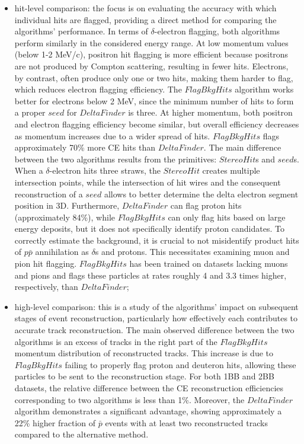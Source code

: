 \begin{itemize}
    \item hit-level comparison: the focus is on evaluating the 
    accuracy with which individual hits are flagged, providing a 
    direct method for comparing the algorithms' performance. In terms 
    of $\delta$-electron flagging, both algorithms perform similarly in the 
    considered energy range. At low momentum values (below 1-2 MeV/c), positron hit flagging 
    is more efficient because positrons are not produced by Compton scattering, 
    resulting in fewer hits. Electrons, by contrast, often produce only one 
    or two hits, making them harder to flag, which reduces electron flagging 
    efficiency. The $FlagBkgHits$ algorithm works better for electrons below 
    2 MeV, since the minimum number of hits to form a 
    proper $seed$ for $DeltaFinder$ is three. At higher momentum, both positron and 
    electron flagging efficiency become similar, but overall efficiency 
    decreases as momentum increases due to a wider spread of hits.
    $FlagBkgHits$ flags approximately 70\% more CE hits than $DeltaFinder$.
    The main difference between the two algorithms results from  
    the primitives: $StereoHit$s and $seed$s. When a $\delta$-electron hits three 
    straws, the $StereoHit$ creates multiple intersection points, while the 
    intersection of hit wires and the consequent reconstruction of 
    a $seed$ allows to better determine the delta electron segment position in 3D. 
    Furthermore, $DeltaFinder$ can flag proton hits (approximately 84\%), while $FlagBkgHits$ 
    can only flag hits based on large energy deposits, but it does not specifically identify proton candidates.
    To correctly estimate the background, it is crucial to not misidentify 
    product hits of $p\bar{p}$ annihilation as $\delta$s and protons.
    This necessitates examining muon and pion hit flagging. $FlagBkgHits$ has been trained 
    on datasets lacking muons and pions and  
    flags these particles at rates roughly 4 and 3.3 times higher, 
    respectively, than $DeltaFinder$;
    
    \item high-level comparison: this is a study of the algorithms' 
    impact on subsequent stages of event reconstruction, particularly 
    how effectively each contributes to accurate track reconstruction. 
    The main observed difference between the two algorithms 
    is an excess of tracks in the right part of the 
    $FlagBkgHits$ momentum distribution of reconstructed tracks. 
    This increase is due to $FlagBkgHits$ failing to 
    properly flag proton and deuteron hits, allowing these particles to be sent to the 
    reconstruction stage. 
    For both 1BB and 2BB datasets, the relative difference between the 
    CE reconstruction efficiencies corresponding to two algorithms is less than 1\%.
    Moreover, the $DeltaFinder$ algorithm demonstrates a significant advantage, 
    showing approximately a 22\% higher fraction of $\bar{p}$ events with at least two reconstructed tracks compared to the alternative method.
\end{itemize}
